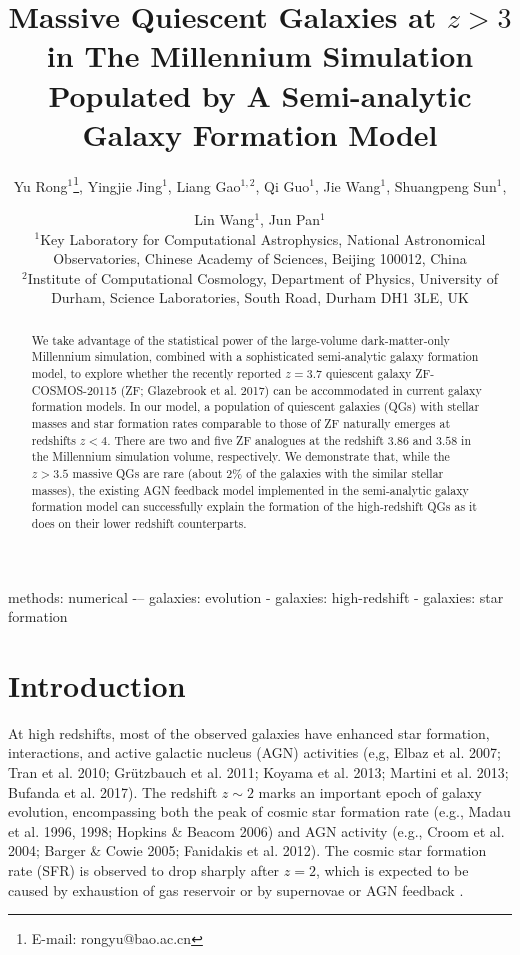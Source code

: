 \documentclass[useAMS,usenatbib]{mn2e}
\title[QG at $z\sim 3.7$]{Massive Quiescent Galaxies at $z>3$ in The Millennium Simulation Populated by A Semi-analytic Galaxy Formation Model}
\author[Rong et al.]{Yu Rong$^{1}$\thanks{E-mail: rongyu@bao.ac.cn}, Yingjie Jing$^{1}$, Liang Gao$^{1,2}$, Qi Guo$^{1}$, Jie Wang$^{1}$, Shuangpeng Sun$^{1}$, \and Lin Wang$^{1}$, Jun Pan$^{1}$\\
$^{1}$Key Laboratory for Computational Astrophysics, National Astronomical Observatories, Chinese Academy of Sciences, Beijing 100012, China\\
$^{2}$Institute of Computational Cosmology, Department of Physics, University of Durham, Science Laboratories, South Road, Durham DH1 3LE, UK
}
\begin{document}
\maketitle

\begin{abstract}
We take advantage of the statistical power of the large-volume dark-matter-only Millennium simulation, combined with a sophisticated semi-analytic galaxy formation model, to explore whether the recently reported $z=3.7$ quiescent galaxy ZF-COSMOS-20115 (ZF; Glazebrook et al. 2017) can be accommodated in current galaxy formation models. In our model, a population of quiescent galaxies (QGs) with stellar masses and star formation rates comparable to those of ZF naturally emerges at redshifts $z<4$. There are two and five ZF analogues at the redshift $3.86$ and $3.58$ in the Millennium simulation volume, respectively. We demonstrate that, while the $z>3.5$ massive QGs are rare (about 2\% of the galaxies with the similar stellar masses), the existing AGN feedback model implemented in the semi-analytic galaxy formation model can successfully explain the formation of the high-redshift QGs as it does on their lower redshift counterparts. 

\end{abstract}
\begin{keywords}
methods: numerical \--– galaxies: evolution \-- galaxies: high-redshift \-- galaxies: star formation
\end{keywords}
\section{Introduction}

At high redshifts, most of the observed galaxies have enhanced star formation, interactions, and active galactic nucleus (AGN) activities (e,g, Elbaz et al. 2007; Tran et al. 2010; Gr\"utzbauch et al. 2011; Koyama et al. 2013; Martini et al. 2013; Bufanda et al. 2017). The redshift $z\sim 2$ marks an important epoch of galaxy evolution, encompassing both the peak of cosmic star formation rate (e.g., Madau et al. 1996, 1998; Hopkins \& Beacom 2006) and AGN activity (e.g., Croom et al. 2004; Barger \& Cowie 2005; Fanidakis et al. 2012). The cosmic star formation rate (SFR) is observed to drop sharply after $z=2$, which is expected to be caused by exhaustion of gas reservoir \citep{Menci08} or by supernovae or AGN feedback \citep{Neistein06,Dekel06,Menci06,vandeVoort11}. 
\end{document}
